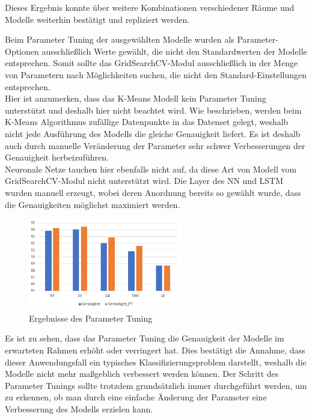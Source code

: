 Dieses Ergebnis konnte über weitere Kombinationen verschiedener Räume und Modelle weiterhin
bestätigt und repliziert werden. 

\newpage
Beim Parameter Tuning der ausgewählten Modelle wurden als Parameter-Optionen ausschließlich Werte gewählt, die nicht 
den Standardwerten der Modelle entsprechen. Somit sollte das GridSearchCV-Modul ausschließlich in der Menge 
von Parametern nach Möglichkeiten suchen, die nicht den Standard-Einstellungen entsprechen.\\
Hier ist anzumerken, dass das K-Means Modell kein Parameter Tuning unterstützt und deshalb hier nicht 
beachtet wird. Wie beschrieben, werden beim K-Means Algorithmus zufällige Datenpunkte in das Datenset
gelegt, weshalb nicht jede Ausführung des Modells die gleiche Genauigkeit liefert. Es ist deshalb auch
durch manuelle Veränderung der Parameter sehr schwer Verbesserungen der Genauigkeit herbeizuführen.\\
Neuronale Netze tauchen hier ebenfalls nicht auf, da diese Art von Modell vom GridSearchCV-Modul nicht
unterstützt wird. Die Layer des NN und LSTM wurden manuell erzeugt, wobei deren Anordnung bereits so
gewählt wurde, dass die Genauigkeiten möglichst maximiert werden.

\begin{figure}[h]
    \centering
    \includegraphics[width=0.6\textwidth]{pic/param_eval.png}
    \caption{Ergebnisse des Parameter Tuning}
    \label{fig:PT_eval}
\end{figure}

Es ist zu sehen, dass das Parameter Tuning die Genauigkeit der Modelle im erwarteten Rahmen erhöht oder 
verringert hat. Dies bestätigt die Annahme, dass dieser Anwendungsfall ein typisches Klassifizierungsproblem 
darstellt, weshalb die Modelle nicht mehr maßgeblich verbessert werden können. Der Schritt des Parameter Tunings 
sollte trotzdem grundsätzlich immer durchgeführt werden, um zu erkennen, ob man durch eine einfache Änderung 
der Parameter eine Verbesserung des Modells erzielen kann.\\

